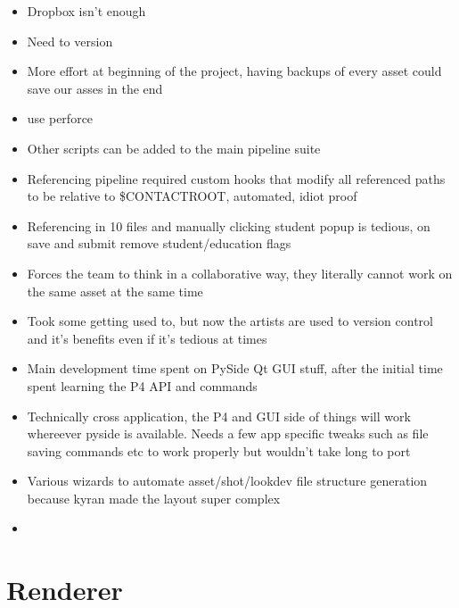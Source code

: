 \documentclass[11pt,a4paper,final,notitlepage]{report}
\newcommand{\noNumberChapter}[2]{
    \setcounter{chapter}{#1}
    \setcounter{section}{0}
    \chapter*{#2}
    \addcontentsline{toc}{chapter}{#2}
}
\begin{document}
\begin{itemize}
	\item Dropbox isn't enough
	\item Need to version
	\item More effort at beginning of the project, having backups of every asset could save our asses in the end
	\item use perforce
	\item Other scripts can be added to the main pipeline suite
	\item Referencing pipeline required custom hooks that modify all referenced paths to be relative to \$CONTACTROOT, automated, idiot proof
	\item Referencing in 10 files and manually clicking student popup is tedious, on save and submit remove student/education flags
	\item Forces the team to think in a collaborative way, they literally cannot work on the same asset at the same time
	\item Took some getting used to, but now the artists are used to version control and it's benefits even if it's tedious at times
	\item Main development time spent on PySide Qt GUI stuff, after the initial time spent learning the P4 API and commands
	\item Technically cross application, the P4 and GUI side of things will work whereever pyside is available. Needs a few app specific tweaks such as file saving commands etc to work properly but wouldn't take long to port
	\item Various wizards to automate asset/shot/lookdev file structure generation because kyran made the layout super complex
	\item 
\end{itemize}

\noNumberChapter{3}{Renderer}
\end{document}
